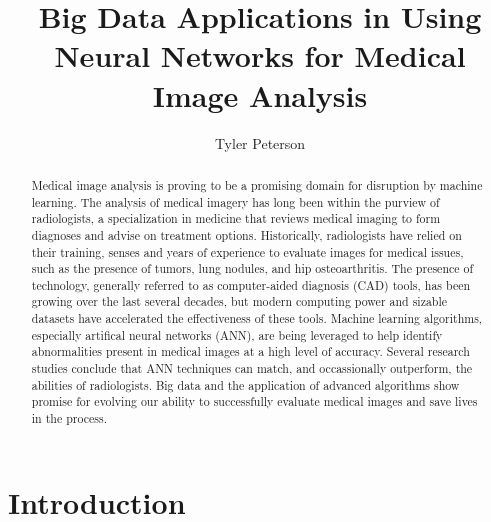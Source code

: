 \documentclass[sigconf]{acmart}
\begin{document}
\title{Big Data Applications in Using Neural Networks for Medical Image Analysis}


\author{Tyler Peterson}


\renewcommand{\shortauthors}{G. v. Laszewski}


\begin{abstract}

 Medical image analysis is proving to be a promising domain for disruption by machine learning. The analysis of medical imagery has long been within the purview of radiologists, a specialization in medicine that reviews medical imaging to form diagnoses and advise on treatment options. Historically, radiologists have relied on their training, senses and years of experience to evaluate images for medical issues, such as the presence of tumors, lung nodules, and hip osteoarthritis. The presence of technology, generally referred to as computer-aided diagnosis (CAD) tools, has been growing over the last several decades, but modern computing power and sizable datasets have accelerated the effectiveness of these tools. Machine learning algorithms, especially artifical neural networks (ANN), are being leveraged to help identify abnormalities present in medical images at a high level of accuracy. Several research studies conclude that ANN techniques can match, and occassionally outperform, the abilities of radiologists. Big data and the application of advanced algorithms show promise for evolving our ability to successfully evaluate medical images and save lives in the process.      
  
\end{abstract}




\maketitle


\section{Introduction}
\end{document}
